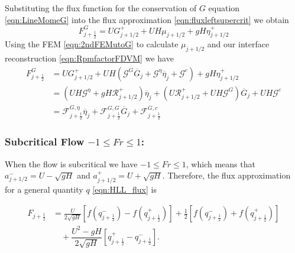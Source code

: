 Substituting the flux function for the conservation of $G$ equation \eqref{eqn:LineMomeG} into the flux approximation \eqref{eqn:fluxleftsupercrit} we obtain
\begin{equation*}
F^G_{j+\frac{1}{2}} =U G^+_{j+1/2} + U  H \mu_{j+1/2} + gH \eta^+_{j+1/2}
\end{equation*}
Using the FEM \eqref{eqn:2ndFEMutoG} to calculate $\mu_{j+1/2}$ and our interface reconstruction \eqref{eqn:RpmfactorFDVM} we have
\begin{align}
F^G_{j+\frac{1}{2}} &=  U G^+_{j+1/2} + UH \left(\mathcal{G}^G \overline{G}_{j} + \mathcal{G}^{\eta} \overline{\eta}_{j} + \mathcal{G}^c\right) + gH \eta^+_{j+1/2} \nonumber \\ &= \left(UH \mathcal{G}^{\eta} + gH \mathcal{R}^+_{j+1/2} \right)  \overline{\eta}_{j} + \left(U\mathcal{R}^+_{j+1/2}  +  UH \mathcal{G}^G \right) \overline{G}_{j} + UH\mathcal{G}^c \nonumber \\
&= \mathcal{F}^{G, \eta}_{j+\frac{1}{2}} \overline{\eta}_{j} + \mathcal{F}^{G, G}_{j+\frac{1}{2}} \overline{G}_{j} + \mathcal{F}^{G, c}_{j+\frac{1}{2}}
\label{eqn:FluxfactorsupercritGleft}
\end{align}


\subsubsection{Subcritical Flow $-1 \le Fr \le 1$:}
When the flow is subcritical we have $-1\le Fr \le 1$, which means that $a^-_{j+ 1/2} =U-\sqrt{g H}$ and $a^+_{j+ 1/2} =  U + \sqrt{g H}$. Therefore, the flux approximation for a general quantity $q$ \eqref{eqn:HLL_flux} is

\begin{align}
F_{j+\frac{1}{2}} &= \frac{U}{2 \sqrt{gH}} \left[f\left(q^-_{j+\frac{1}{2}}\right) - f\left(q^+_{j+\frac{1}{2}}\right) \right]  + \frac{1}{2}\left[f\left(q^-_{j+\frac{1}{2}}\right) + f\left(q^+_{j+\frac{1}{2}}\right)\right] \nonumber \\ & \quad  + \dfrac{U^2 - gH}{2\sqrt{g H}} \left [ q^+_{j+\frac{1}{2}} - q^-_{j+\frac{1}{2}} \right ].
\label{eqn:fluxsubcrit}
\end{align}

